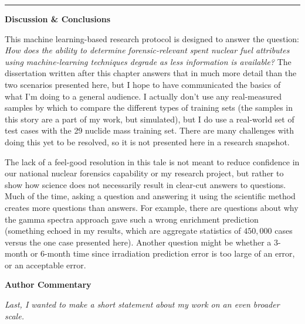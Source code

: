 {\hrule

\begin{tcolorbox}[halign=center]
\textbf{Discussion \& Conclusions}
\end{tcolorbox}

This machine learning-based research protocol is designed to answer the
question: \textit{How does the ability to determine forensic-relevant spent
nuclear fuel attributes using machine-learning techniques degrade as less
information is available?} The dissertation written after this chapter answers
that in much more detail than the two scenarios presented here, but I hope to
have communicated the basics of what I'm doing to a general audience. I
actually don't use any real-measured samples by which to compare the different
types of training sets (the samples in this story are a part of my work, but
simulated), but I do use a real-world set of test cases with the 29 nuclide
mass training set.  There are many challenges with doing this yet to be
resolved, so it is not presented here in a research snapshot.

The lack of a feel-good resolution in this tale is not meant to reduce
confidence in our national nuclear forensics capability or my research project,
but rather to show how science does not necessarily result in clear-cut answers
to questions. Much of the time, asking a question and answering it using the
scientific method creates more questions than answers. For example,  there are
questions about why the gamma spectra approach gave such a wrong enrichment
prediction (something echoed in my results, which are aggregate statistics of
$450,000$ cases versus the one case presented here). Another question might be
whether a 3-month or 6-month time since irradiation prediction error is too
large of an error, or an acceptable error.

\begin{tcolorbox}[halign=center]
\textbf{Author Commentary}
\end{tcolorbox}

\textit{Last, I wanted to make a short statement about my work on an even
broader scale.}

}
